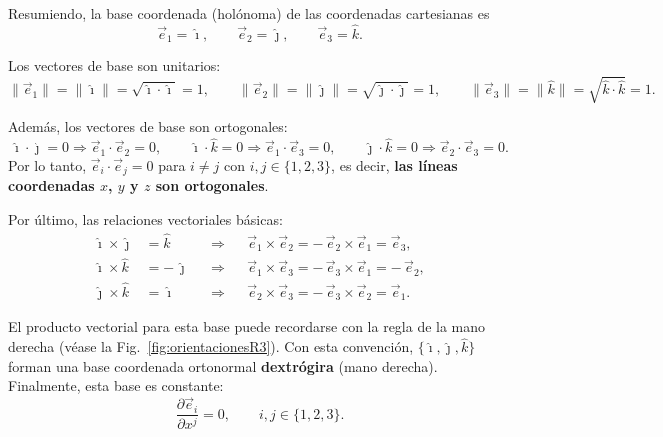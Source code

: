 \documentclass[../apunte_mecanica_clasica.tex]{subfiles}%
\begin{document}
\begin{apuntebloque}{}

Resumiendo, la base coordenada (holónoma) de las coordenadas cartesianas es
\begin{equation*}
\vec{e}_1 = \hat{\imath},\qquad
\vec{e}_2 = \hat{\jmath},\qquad
\vec{e}_3 = \hat{k}.
\end{equation*}

Los vectores de base son unitarios:
\begin{equation*}
\|\vec{e}_1\| = \|\hat{\imath}\| = \sqrt{\hat{\imath}\!\cdot\!\hat{\imath}} = 1,\qquad
\|\vec{e}_2\| = \|\hat{\jmath}\| = \sqrt{\hat{\jmath}\!\cdot\!\hat{\jmath}} = 1,\qquad
\|\vec{e}_3\| = \|\hat{k}\| = \sqrt{\hat{k}\!\cdot\!\hat{k}} = 1.
\end{equation*}

Además, los vectores de base son ortogonales:
\begin{equation*}
\hat{\imath}\!\cdot\!\hat{\jmath} = 0 \Rightarrow \vec{e}_1\!\cdot\!\vec{e}_2 = 0,\qquad
\hat{\imath}\!\cdot\!\hat{k} = 0 \Rightarrow \vec{e}_1\!\cdot\!\vec{e}_3 = 0,\qquad
\hat{\jmath}\!\cdot\!\hat{k} = 0 \Rightarrow \vec{e}_2\!\cdot\!\vec{e}_3 = 0.
\end{equation*}
Por lo tanto, $\vec{e}_i\!\cdot\!\vec{e}_j = 0$ para $i\neq j$ con $i,j\in\{1,2,3\}$, es decir, \textbf{las líneas coordenadas $x$, $y$ y $z$ son ortogonales}.

Por último, las relaciones vectoriales básicas:
\begin{equation*}
\begin{aligned}
\hat{\imath} \times \hat{\jmath} &= \hat{k} &&\Rightarrow&& \vec{e}_1 \times \vec{e}_2 = -\,\vec{e}_2 \times \vec{e}_1 = \vec{e}_3,\\[4pt]
\hat{\imath} \times \hat{k} &= -\,\hat{\jmath} &&\Rightarrow&& \vec{e}_1 \times \vec{e}_3 = -\,\vec{e}_3 \times \vec{e}_1 = -\,\vec{e}_2,\\[4pt]
\hat{\jmath} \times \hat{k} &= \hat{\imath} &&\Rightarrow&& \vec{e}_2 \times \vec{e}_3 = -\,\vec{e}_3 \times \vec{e}_2 = \vec{e}_1.
\end{aligned}
\end{equation*}

El producto vectorial para esta base puede recordarse con la regla de la mano derecha (véase la Fig.~\ref{fig:orientacionesR3}). Con esta convención, $\{\hat{\imath},\hat{\jmath},\hat{k}\}$ forman una base coordenada ortonormal \textbf{dextrógira} (mano derecha). Finalmente, esta base es constante:
\begin{equation*}
\frac{\partial \vec{e}_i}{\partial x^j} = 0,\qquad i,j\in\{1,2,3\}.
\end{equation*}
\end{apuntebloque}
\end{document}
